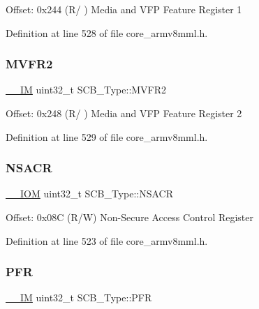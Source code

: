 Offset\+: 0x244 (R/ ) Media and V\+FP Feature Register 1 

Definition at line 528 of file core\+\_\+armv8mml.\+h.

\mbox{\label{struct_s_c_b___type_a280ef961518ecee3ed43a86404853c3d}} 
\subsubsection{\texorpdfstring{M\+V\+F\+R2}{MVFR2}}
{\footnotesize\ttfamily \hyperlink{core__sc300_8h_a4cc1649793116d7c2d8afce7a4ffce43}{\+\_\+\+\_\+\+IM} uint32\+\_\+t S\+C\+B\+\_\+\+Type\+::\+M\+V\+F\+R2}

Offset\+: 0x248 (R/ ) Media and V\+FP Feature Register 2 

Definition at line 529 of file core\+\_\+armv8mml.\+h.

\mbox{\label{struct_s_c_b___type_a525790dfb9d9e3dd8eb126cdfebcd472}} 
\subsubsection{\texorpdfstring{N\+S\+A\+CR}{NSACR}}
{\footnotesize\ttfamily \hyperlink{core__sc300_8h_ab6caba5853a60a17e8e04499b52bf691}{\+\_\+\+\_\+\+I\+OM} uint32\+\_\+t S\+C\+B\+\_\+\+Type\+::\+N\+S\+A\+CR}

Offset\+: 0x08C (R/W) Non-\/\+Secure Access Control Register 

Definition at line 523 of file core\+\_\+armv8mml.\+h.

\mbox{\label{struct_s_c_b___type_a40745bb0af880c45827a653222d54117}} 
\subsubsection{\texorpdfstring{P\+FR}{PFR}}
{\footnotesize\ttfamily \hyperlink{core__sc300_8h_a4cc1649793116d7c2d8afce7a4ffce43}{\+\_\+\+\_\+\+IM} uint32\+\_\+t S\+C\+B\+\_\+\+Type\+::\+P\+FR}

